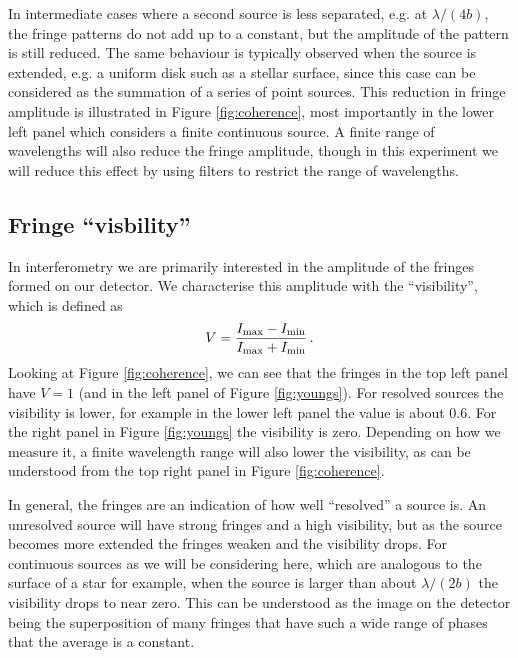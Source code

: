 \documentclass[11pt]{article}
\begin{document}
In intermediate cases where a second source is less separated, e.g. at $\lambda/(4b)$, the fringe patterns do not add up to a constant, but the amplitude of the pattern is still reduced. The same behaviour is typically observed when the source is extended, e.g. a uniform disk such as a stellar surface, since this case can be considered as the summation of a series of point sources. This reduction in fringe amplitude is illustrated in Figure \ref{fig:coherence}, most importantly in the lower left panel which considers a finite continuous source. A finite range of wavelengths will also reduce the fringe amplitude, though in this experiment we will reduce this effect by using filters to restrict the range of wavelengths.

\subsection{Fringe ``visbility''}

In interferometry we are primarily interested in the amplitude of the fringes formed on our detector. We characterise this amplitude with the ``visibility'', which is defined as
\begin{equation}\label{eq:vis}
    V = \frac{I_{\rm max} - I_{\rm min}}{I_{\rm max} + I_{\rm min}} \, .
\end{equation}
Looking at Figure \ref{fig:coherence}, we can see that the fringes in the top left panel have $V=1$ (and in the left panel of Figure \ref{fig:youngs}). For resolved sources the visibility is lower, for example in the lower left panel the value is about 0.6. For the right panel in Figure \ref{fig:youngs} the visibility is zero. Depending on how we measure it, a finite wavelength range will also lower the visibility, as can be understood from the top right panel in Figure \ref{fig:coherence}.

\clearpage

In general, the fringes are an indication of how well ``resolved'' a source is. An unresolved source will have strong fringes and a high visibility, but as the source becomes more extended the fringes weaken and the visibility drops. For continuous sources as we will be considering here, which are analogous to the surface of a star for example, when the source is larger than about $\lambda/(2b)$ the visibility drops to near zero. This can be understood as the image on the detector being the superposition of many fringes that have such a wide range of phases that the average is a constant.
\end{document}
